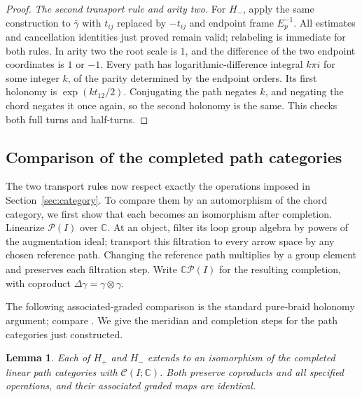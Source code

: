 \documentclass[11pt]{article}
\newtheorem{lemma}[theorem]{Lemma}
\theoremstyle{definition}
\theoremstyle{remark}
\numberwithin{equation}{section}
\begin{document}
\begin{proof}
\emph{The second transport rule and arity two.}
For $H_-$, apply the same construction to $\bar\gamma$ with
$t_{ij}$ replaced by $-t_{ij}$ and endpoint frame $E_p^{-1}$.
All estimates and cancellation identities just proved remain valid;
relabeling is immediate for both rules.  In arity two the root scale
is $1$, and the difference of the two endpoint coordinates is $1$ or
$-1$.  Every path has logarithmic-difference integral $k\pi i$ for
some integer $k$, of the parity determined by the endpoint orders.
Its first holonomy is $\exp(kt_{12}/2)$.  Conjugating the path negates
$k$, and negating the chord negates it once again, so the second
holonomy is the same.  This checks both full turns and half-turns.
\end{proof}

\subsection{Comparison of the completed path categories}
The two transport rules now respect exactly the operations imposed in
Section~\ref{sec:category}.  To compare them by an automorphism of the
chord category, we first show that each becomes an isomorphism after
completion.
Linearize $\mathcal P(I)$ over $\mathbb C$.
At an object, filter its loop group algebra by powers
of the augmentation ideal; transport this filtration to every arrow
space by any chosen reference path.  Changing the reference path
multiplies by a group element and preserves each filtration step.
Write $\widehat{\mathbb C\mathcal P(I)}$ for the resulting completion, with
coproduct $\Delta\gamma=\gamma\otimes\gamma$.

The following associated-graded comparison is the standard pure-braid
holonomy argument; compare \cite[Proposition~3.6]{BarNatan}.
We give the meridian and completion steps for the path categories just
constructed.

\begin{lemma}\label{lem:holonomy-isomorphism}
Each of $H_+$ and $H_-$ extends to an isomorphism of the completed
linear path categories with $\mathcal C(I;\mathbb C)$.  Both preserve
coproducts and all specified operations, and their associated graded
maps are identical.
\end{lemma}
\end{document}
